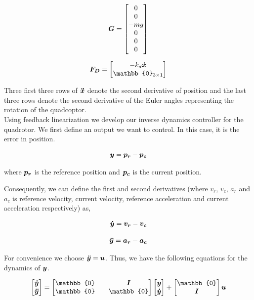 \documentclass[12pt,fleqn]{article}
\newcommand{\mbm}[1]{\mbox{\boldmath $#1$}}
\begin{document}
$$ \mbm{G} = \begin{bmatrix} 0 \\ 0\\ -mg\\ 0\\ 0\\ 0 \end{bmatrix} $$

$$ \mbm{F_D} = \begin{bmatrix} -k_d \mbm{\dot{x}}\\
  \mathbb{0}_{3\times1} \end{bmatrix} $$

Three first three rows of $\mbm{\ddot{x}}$ denote the second derivative of
position and the last three rows denote the second derivative of the
Euler angles representing the rotation of the quadcoptor.\\

Using feedback linearization we develop our inverse dynamics
controller for the quadrotor. We first define an output we want to
control. In this case, it is the error in position.

\begin{equation} \label{y}
$$ \mbm{y} = \mbm{p_r} - \mbm{p_c} $$ 
\end{equation}

where $\mbm{p_r}$ is the reference position and $\mbm{p_c}$ is the current
position.

Consequently, we can define the first and second derivatives (where
$v_r$, $v_c$, $a_r$ and $a_c$ is reference velocity, current velocity,
reference acceleration and current acceleration respectively) as,

\begin{equation} \label{ydot}
$$ \mbm{\dot{y}} = \mbm{v_r} - \mbm{v_c} $$
\end{equation}

\begin{equation} \label{accel}
$$ \mbm{\ddot{y}} = \mbm{a_r} - \mbm{a_c} $$
\end{equation}

For convenience we choose $\mbm{\ddot{y}} = \mbm{u}$. Thus, we have
the following equations for the dynamics of $\mbm{y}$.

\begin{equation} \label{y_dynamics}
$$ \begin{bmatrix} \mbm{\dot{y}} \\ \mbm{\ddot{y}} \end{bmatrix}
= \begin{bmatrix} \mathbb{0} && \mbm{I} \\ \mathbb{0} &&
  \mathbb{0} \end{bmatrix} \begin{bmatrix} \mbm{y} \\
  \mbm{\dot{y}}\end{bmatrix} + \begin{bmatrix} \mathbb{0}  \\
  \mbm{I} \end{bmatrix} \mbm{u}$$
\end{equation}
\end{document}
